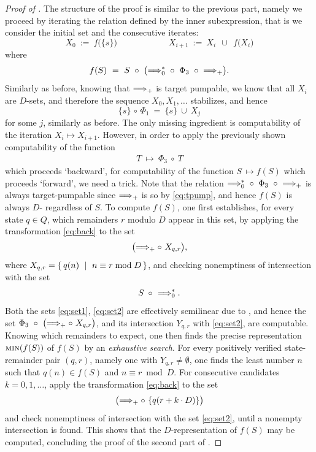\begin{proof}[Proof of ]
The structure of the proof is similar to the previous part, namely
we proceed by iterating the relation defined by the inner subexpression, 
that is we consider the initial set
and the consecutive iterates:
\[
X_0 \ := \ f\bigl(\{s\}\bigr) 
\qquad\qquad\qquad
X_{i+1} \ := \ X_i \ \ \cup \ \ 
f\bigl(X_i\bigr)
\]
where
\[
f(S) \ = \ S \ 
\circ \ \bigl({\stepp{0}^*} \ \circ \ \Phi_3 \ \circ \ {\stepp +}\bigr).
\]
Similarly as before, knowing that $\Longrightarrow_{+}$ is target pumpable, we know
that all $X_i$ are $D$-\saturated sets, and therefore the sequence 
$X_0, X_1, \ldots$ stabilizes, and hence
\[
\{s\} \,\circ\, \Phi_1 \ = \ 
 \{s\} \ \cup \  X_j
\]
for some $j$, similarly as before.
The only missing ingredient is computability of the iteration
$X_i \mapsto X_{i+1}$.
However, in order to apply the previously shown computability of 
the function
\begin{align} \label{eq:back}
T \ \mapsto \ \Phi_3 \ \circ \ T
\end{align}
which proceeds `backward', for computability
of the function
$
S \, \mapsto  f(S)
$
which proceeds `forward', we need a trick.
Note that the relation 
${\Longrightarrow_{0}^*} \  \circ \ \Phi_3 \ \circ \  {\Longrightarrow_{+}}$ is always
target-pumpable since $\Longrightarrow_{+}$ is so by \eqref{eq:tpump},
and hence $f(S)$ is always $D$-\saturated
regardless of $S$.
To compute $f(S)$, one first establishes, for every state $q\in Q$, 
which remainders $r$ modulo $D$ appear in this set,
by applying the transformation \eqref{eq:back} to the set
\begin{align} \label{eq:set1}
\bigl(\Longrightarrow_{+} \circ \ X_{q,r}\bigr)
,
\end{align} 
where $X_{q,r} = \{\,q(n) \ \mid \ n\equiv r \bmod D\,\}$,
and checking nonemptiness of intersection with 
the set 
\begin{align} \label{eq:set2}
S\ \,\circ \ \Longrightarrow_{0}^*.
\end{align} 
Both the sets \eqref{eq:set1}, \eqref{eq:set2} 
are effectively semilinear due to 
, and hence the set
$\Phi_3 \ \circ \ \bigl(\stepp + \circ \ X_{q,r}\bigr)$,
and its intersection $Y_{q,r}$ with \eqref{eq:set2}, are
computable.
Knowing which remainders to expect,
one then finds the precise representation
$\textsc{min}(f(S))$ of $f(S)$ by an \emph{exhaustive search}.
For every positively verified state-remainder pair $(q,r)$,
namely one with $Y_{q,r}\neq\emptyset$, 
one finds the least number $n$ such that
$q(n)\in f(S)$ and $n\equiv r \bmod D$.
For consecutive candidates $k=0, 1, \ldots$, 
apply the transformation \eqref{eq:back} to the set
\[
\bigl(\Longrightarrow_{+} \circ \ \{q(r+k\cdot D)\}\bigr)
\]
and check nonemptiness of intersection with the set \eqref{eq:set2},
until a nonempty intersection is found.
This shows that the $D$-\saturated representation of $f(S)$ may be
computed, concluding the proof of the second part of .
\end{proof}


